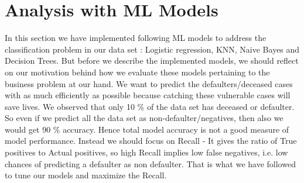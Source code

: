 \documentclass[12pt,a4paper]{article}
\begin{document}
	\section{Analysis with ML Models}
	In this section we have implemented following ML models to address the classification problem in our data set : Logistic regression, KNN, Naive Bayes and Decision Trees. But before we describe the implemented models, we should reflect on our motivation behind how we evaluate these models pertaining to the business problem at our hand. We want to predict the defaulters/deceased cases with as much efficiently as possible because catching these vulnerable cases will save lives. We observed that only 10 \% of the data set has deceased or defaulter. So even if we predict all the data set as non-defaulter/negatives, then also we would get 90 \% accuracy. Hence total model accuracy is not a good measure of model performance. Instead we should focus on Recall - It gives the ratio of True positives to Actual positives, so high Recall implies low false negatives, i.e. low chances of predicting a defaulter as non defaulter. That is what we have followed to tune our models and maximize the Recall.   
\end{document}

